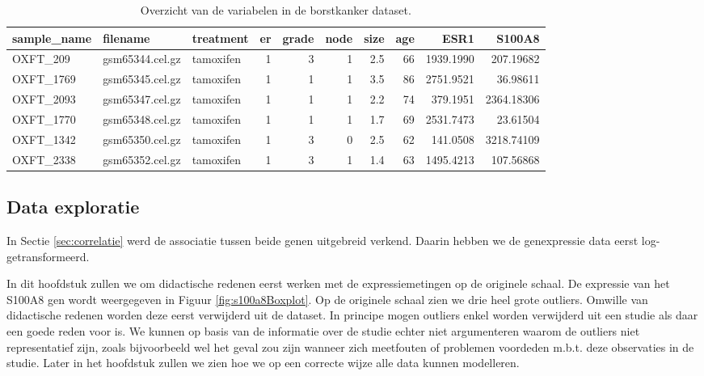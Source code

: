 \documentclass[
  12pt,dutch]{book}
\theoremstyle{definition}
\theoremstyle{definition}
\theoremstyle{definition}
\theoremstyle{definition}
\theoremstyle{remark}
\begin{document}
\begin{table}

\caption{\label{tab:brcaMicroLin}Overzicht van de variabelen in de borstkanker dataset.}
\centering
\begin{tabular}[t]{lllrrrrrrr}
\toprule
sample\_name & filename & treatment & er & grade & node & size & age & ESR1 & S100A8\\
\midrule
OXFT\_209 & gsm65344.cel.gz & tamoxifen & 1 & 3 & 1 & 2.5 & 66 & 1939.1990 & 207.19682\\
OXFT\_1769 & gsm65345.cel.gz & tamoxifen & 1 & 1 & 1 & 3.5 & 86 & 2751.9521 & 36.98611\\
OXFT\_2093 & gsm65347.cel.gz & tamoxifen & 1 & 1 & 1 & 2.2 & 74 & 379.1951 & 2364.18306\\
OXFT\_1770 & gsm65348.cel.gz & tamoxifen & 1 & 1 & 1 & 1.7 & 69 & 2531.7473 & 23.61504\\
OXFT\_1342 & gsm65350.cel.gz & tamoxifen & 1 & 3 & 0 & 2.5 & 62 & 141.0508 & 3218.74109\\
\addlinespace
OXFT\_2338 & gsm65352.cel.gz & tamoxifen & 1 & 3 & 1 & 1.4 & 63 & 1495.4213 & 107.56868\\
\bottomrule
\end{tabular}
\end{table}

\subsection{Data exploratie}\label{data-exploratie}

In Sectie \ref{sec:correlatie} werd de associatie tussen beide genen uitgebreid verkend. Daarin hebben we de genexpressie data eerst log-getransformeerd.

In dit hoofdstuk zullen we om didactische redenen eerst werken met de expressiemetingen op de originele schaal.
De expressie van het S100A8 gen wordt weergegeven in Figuur \ref{fig:s100a8Boxplot}. Op de originele schaal zien we drie heel grote outliers. Omwille van didactische redenen worden deze eerst verwijderd uit de dataset. In principe mogen outliers enkel worden verwijderd uit een studie als daar een goede reden voor is. We kunnen op basis van de informatie over de studie echter niet argumenteren waarom de outliers niet representatief zijn, zoals bijvoorbeeld wel het geval zou zijn wanneer zich meetfouten of problemen voordeden m.b.t. deze observaties in de studie. Later in het hoofdstuk zullen we zien hoe we op een correcte wijze alle data kunnen modelleren.
\end{document}
